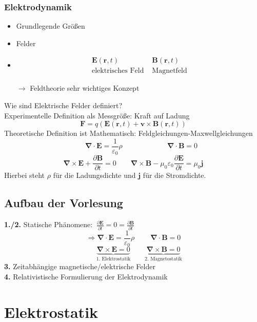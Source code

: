 \documentclass[titlepage,11pt,a4paper,ngerman]{report}
\newcommand{\tx}[1]{\textrm{#1}}
\newcommand{\prt}[2]{\frac{\partial #1}{\partial #2}}
\renewcommand{\vec}[1]{\boldsymbol{#1}}
\newcommand{\lcom}[1]{\color{MidnightBlue}#1\color{black}}
\renewcommand{\epsilon}{\varepsilon}
\begin{document}
\subsection{Elektrodynamik}
\begin{itemize}
	\item Grundlegende Größen
	\item Felder
	\item 
	\begin{equation*}
	\begin{array}{cc}
	\vec{E}(\vec{r},t)\ \ \  & \vec{B}(\vec{r},t) \\[5pt]
	\tx{elektrisches Feld \ \ \ } &  \tx{Magnetfeld}
	\end{array}
	\end{equation*}
	\item[$\boldsymbol{\rightarrow}$] Feldtheorie \lcom{sehr wichtiges Konzept}
\end{itemize}
\lcom{Wie sind Elektrische Felder definiert?}\\
Experimentelle Definition als Messgröße: Kraft auf Ladung
$$\vec{F} = q(\vec{E}(\vec{r},t) + \vec{v} \times \vec{B}(\vec{r},t))$$
Theoretische Definition ist Mathematisch: Feldgleichungen-Maxwellgleichungen
$$ \ \qquad \vec\nabla \cdot\vec{E} = \frac{1}{\epsilon_0}\rho \qquad \qquad \ \qquad  \vec\nabla\cdot\vec{B} = 0$$
$$\vec\nabla\times\vec{E} + \prt{\vec{B}}{t} = 0 \qquad \vec\nabla\times\vec{B} - \mu_0 \epsilon_0 \prt{\vec{E}}{t} = \mu_0 \vec{j}$$
Hierbei steht $\rho$ für die Ladungsdichte und $\vec{j}$ für die Stromdichte.

\section{Aufbau der Vorlesung}
\textbf{1./2.} Statische Phänomene: $ \ \prt{\vec{E}}{t} = 0 = \prt{\vec{B}}{t}$
$$\Rightarrow \vec\nabla\cdot\vec{E} = \frac{1}{\epsilon_0}\rho \qquad\ \vec\nabla \cdot \vec{B} = 0$$
$$\ \ \, \quad\underbrace{\vec\nabla\times\vec{E} = 0}_{\textrm{1. Elektrostatik}} \qquad \underbrace{\vec\nabla\times\vec{B} = 0}_{\textrm{2. Magnetostatik}}$$
\textbf{3.} Zeitabhängige magnetische/elektrische Felder\\
\textbf{4.} Relativistische Formulierung der Elektrodynamik

\chapter{Elektrostatik}
\end{document}
